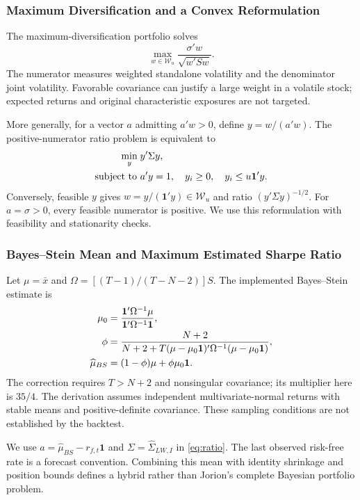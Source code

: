 \documentclass[letterpaper,journal]{IEEEtran}
\begin{document}
\subsubsection{Maximum Diversification and a Convex Reformulation}\label{sec:ratio}
The maximum-diversification portfolio \cite{mdp} solves
\begin{equation}\label{eq:ratio}
 \max_{w\in\mathcal W_u}\frac{\sigma'w}{\sqrt{w'Sw}}.
\end{equation}
The numerator measures weighted standalone volatility and the denominator joint volatility. Favorable covariance can justify a large weight in a volatile stock; expected returns and original characteristic exposures are not targeted.

More generally, for a vector $a$ admitting $a'w>0$, define $y=w/(a'w)$. The positive-numerator ratio problem is equivalent to
\begin{align}\label{eq:ratioqp}
 \min_y\;&y'\Sigma y,\notag\\
 \text{subject to }&a'y=1,\quad y_i\geq0,\quad y_i\leq u\mathbf1'y.
\end{align}
Conversely, feasible $y$ gives $w=y/(\mathbf1'y)\in\mathcal W_u$ and ratio $(y'\Sigma y)^{-1/2}$. For $a=\sigma>0$, every feasible numerator is positive. We use this reformulation with feasibility and stationarity checks.

\subsubsection{Bayes--Stein Mean and Maximum Estimated Sharpe Ratio}
Let $\mu=\bar x$ and $\Omega=[(T-1)/(T-N-2)]S$. The implemented Bayes--Stein estimate \cite{jorion} is
\begin{align}
 \mu_0&=\frac{\mathbf1'\Omega^{-1}\mu}{\mathbf1'\Omega^{-1}\mathbf1},\notag\\
 \phi&=\frac{N+2}{N+2+T(\mu-\mu_0\mathbf1)'\Omega^{-1}(\mu-\mu_0\mathbf1)},\\
 \widehat\mu_{BS}&=(1-\phi)\mu+\phi\mu_0\mathbf1.\notag
\end{align}
The correction requires $T>N+2$ and nonsingular covariance; its multiplier here is $35/4$. The derivation assumes independent multivariate-normal returns with stable means and positive-definite covariance. These sampling conditions are not established by the backtest.

We use $a=\widehat\mu_{BS}-r_{f,t}\mathbf1$ and $\Sigma=\widehat\Sigma_{LW,I}$ in \eqref{eq:ratio}. The last observed risk-free rate is a forecast convention. Combining this mean with identity shrinkage and position bounds defines a hybrid rather than Jorion's complete Bayesian portfolio problem.
\end{document}
